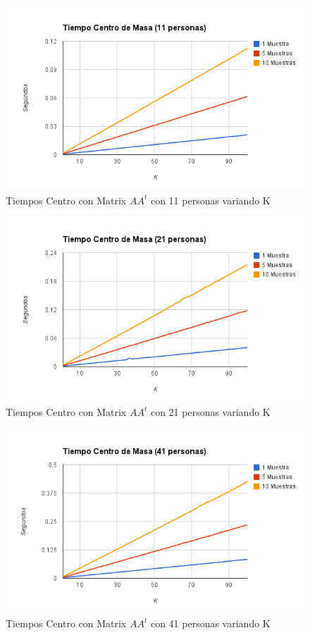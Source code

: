 \begin{figure}[H] \includegraphics[width=1\textwidth]{img/imageg.png} \caption{Tiempos Centro con
    Matrix $AA^t$ con 11 personas variando K} \end{figure}

\begin{figure}[H] \includegraphics[width=1\textwidth]{img/imageh.png} \caption{Tiempos Centro con
    Matrix $AA^t$ con 21 personas variando K} \end{figure}

\begin{figure}[H] \includegraphics[width=1\textwidth]{img/imagei.png} \caption{Tiempos Centro con
    Matrix $AA^t$ con 41 personas variando K} \end{figure}

